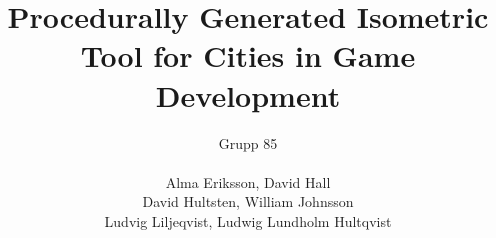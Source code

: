 \pagestyle{empty}

\begin{titlepage}
\title{ \Huge{Procedurally Generated Isometric Tool for Cities in Game Development} \noindent\makebox[\linewidth]{\textcolor{light-gray}{\rule{\paperwidth}{0.1pt}}}}
\author{\LARGE{{Grupp 85}} \\\\ 
[0.30cm] Alma Eriksson, David Hall\\
[0.30cm] David Hultsten, William Johnsson\\
[0.30cm] Ludvig Liljeqvist, Ludwig Lundholm Hultqvist
\\[0.1cm]}
\maketitle
\thispagestyle{empty}
\end{titlepage}

\clearpage
\maketitle